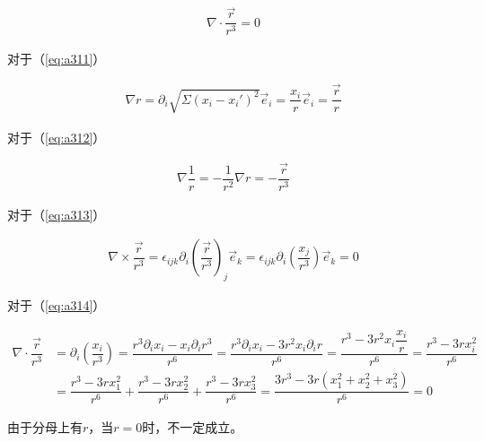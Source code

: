 \documentclass{article}
\begin{document}
\begin{equation}
  \label{eq:a314}
  \begin{aligned}
    \nabla \cdot \dfrac{\vec{r}}{r^3}  = 0  
  \end{aligned}
\end{equation}

对于（\ref{eq:a311}）

\begin{equation*}
  \begin{aligned}
    \nabla r = \partial_i \sqrt{ \Sigma \left( x_i - x_i' \right)^2} \vec{e}_i = \dfrac{x_i}{r} \vec{e}_i = \dfrac{\vec{r}}{r}  
  \end{aligned}
\end{equation*}

对于（\ref{eq:a312}）

\begin{equation*}
  \begin{aligned}
    \nabla \dfrac{1}{r} = - \dfrac{1}{r^2} \nabla r = - \dfrac{\vec{r}}{r^3} 
  \end{aligned}
\end{equation*}

对于（\ref{eq:a313}）

\begin{equation*}
  \begin{aligned}
    \nabla \times \dfrac{\vec{r}}{r^3} = \epsilon_{ijk} \partial_i \left( \dfrac{\vec{r}}{r^3}  \right)_j \vec{e}_k = \epsilon_{ijk} \partial_i \left( \dfrac{x_j}{r^3}  \right) \vec{e}_k = 0
  \end{aligned}
\end{equation*}

对于（\ref{eq:a314}）

\begin{equation*}
  \begin{aligned}
    \nabla \cdot \dfrac{\vec{r}}{r^3}  &= \partial_i \left( \dfrac{x_i}{r^3}  \right) = \dfrac{r^3 \partial_i x_i - x_i \partial_i r^3}{r^6} = \dfrac{r^3 \partial_i x_i - 3 r^2 x_i \partial_i r}{r^6 } = \dfrac{r^3 - 3 r^2 x_i \dfrac{x_i}{r} }{r^6} = \dfrac{r^3 - 3 r x_i^2  }{r^6}  \\
    &= \dfrac{r^3 - 3 r x_1^2  }{r^6} + \dfrac{r^3 - 3 r x_2^2  }{r^6} + \dfrac{r^3 - 3 r x_3^2  }{r^6} = \dfrac{3 r^3 - 3r \left( x_1^2 + x_2^2 + x_3^2 \right)}{r^6} = 0
  \end{aligned}
\end{equation*}

由于分母上有$r$，当$r=0$时，不一定成立。
\end{document}
